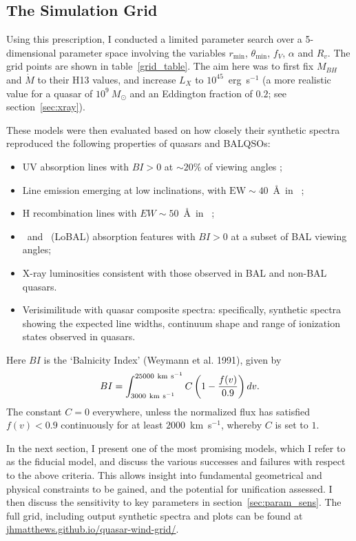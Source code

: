 \subsection{The Simulation Grid}
\label{sec:sim_grid}
Using this prescription, I conducted a limited parameter
search over a 5-dimensional parameter space involving the 
variables $r_{\mathrm{min}}$, $\theta_{\mathrm{min}}$, $f_V$, $\alpha$ and $R_v$.
The grid points are shown in table~\ref{grid_table}.
The aim here was to first fix $M_{BH}$ and $\dot{M}$ to their H13 values,
and increase $L_X$ to $10^{45}$~erg~s$^{-1}$ (a more realistic value for a 
quasar of $10^9~M_\odot$ and an Eddington fraction of $0.2$; see section~\ref{sec:xray}).

These models were then evaluated based on 
how closely their synthetic spectra reproduced the 
following properties of quasars and BALQSOs:

\begin{itemize}
\item UV absorption lines 
with $BI > 0$ at $\sim20\%$ of viewing angles \cite[e.g.][]{knigge2008};
\item Line emission emerging at low inclinations, with $\mathrm{EW}\sim40$~\AA\ in \civline\ \citep[e.g. ][]{shen2011};
\item H recombination lines with $EW\sim50$~\AA\ in \la\ \citep[e.g.][]{shen2011};
\item \mg\ and \al\ (LoBAL) absorption features with $BI > 0$ at a subset of 
BAL viewing angles;
\item X-ray luminosities consistent with those observed in BAL and non-BAL
quasars.
\item Verisimilitude with quasar composite spectra: specifically, synthetic spectra showing
the expected line widths, continuum shape and range of ionization states observed
in quasars.
\end{itemize}
Here $BI$ is the `Balnicity Index' (Weymann et al. 1991), given by
\begin{equation}
BI = \int^{25000~{\rm km~s}^{-1}}_{3000~{\rm km~s}^{-1}} C \left( 1 - \frac{f(v)}{0.9} \right) dv.
\end{equation}
The constant $C=0$ everywhere, unless the normalized flux
has satisfied $f(v)<0.9$ continuously for at least $2000$~km~s$^{−1}$, 
whereby $C$ is set to $1$.

In the next section, I present one of the most promising models,
which I refer to as the fiducial model, and discuss
the various successes and failures with respect to the above criteria.
This allows insight into fundamental geometrical 
and physical constraints to be gained, 
and the potential for unification assessed. 
I then discuss the sensitivity to key parameters in section~\ref{sec:param_sens}.
The full grid, including output synthetic spectra and plots can be found at
\url{jhmatthews.github.io/quasar-wind-grid/}.

